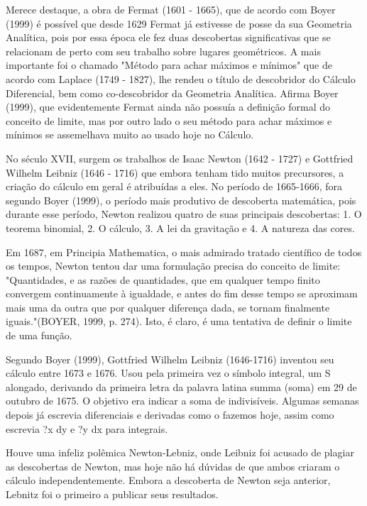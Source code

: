 \documentclass{article}
\begin{document}
\medskip
 Merece destaque, a obra de Fermat (1601 - 1665), que de acordo com
Boyer (1999) é possível que desde 1629 Fermat já estivesse de posse
da sua Geometria Analítica, pois por essa época ele fez duas
descobertas significativas que se relacionam de perto com seu
trabalho sobre lugares geométricos. A mais importante foi o chamado
"Método para achar máximos e mínimos" que de acordo com Laplace
(1749 - 1827), lhe rendeu o título de descobridor do Cálculo
Diferencial, bem como co-descobridor da Geometria Analítica.  Afirma
Boyer (1999), que evidentemente Fermat ainda não possuía a definição
formal do conceito de limite, mas por outro lado o seu método para
achar máximos e mínimos se assemelhava muito ao usado hoje no
Cálculo.

\medskip
 No século XVII, surgem
os trabalhos de Isaac Newton (1642 - 1727) e Gottfried Wilhelm
Leibniz (1646 - 1716) que embora tenham tido muitos precursores, a
criação do cálculo em geral é atribuídas a eles. No período de
1665-1666, fora segundo Boyer (1999), o período mais produtivo de
descoberta matemática, pois durante esse período, Newton realizou
quatro de suas principais descobertas: 1. O teorema binomial, 2. O
cálculo, 3. A lei da gravitação e 4. A natureza das cores.

\medskip
 Em 1687,
em Principia Mathematica, o mais admirado tratado científico de
todos os tempos, Newton tentou dar uma formulação precisa do
conceito de limite: "Quantidades, e as razões de quantidades, que em
qualquer tempo finito convergem continuamente à igualdade, e antes
do fim desse tempo se aproximam mais uma da outra que por qualquer
diferença dada, se tornam finalmente iguais."(BOYER, 1999, p. 274). Isto, é claro, é uma
tentativa de definir o limite de uma função.

\medskip
 Segundo Boyer (1999),
Gottfried Wilhelm Leibniz (1646-1716) inventou seu cálculo entre
1673 e 1676. Usou pela primeira vez o símbolo integral, um S
alongado, derivando da primeira letra da palavra latina summa (soma)
em 29 de outubro de 1675. O objetivo era indicar a soma de
indivisíveis. Algumas semanas depois já escrevia diferenciais e
derivadas como o fazemos hoje, assim como escrevia ?x dy e ?y dx
para integrais.

\medskip
 Houve uma infeliz polêmica Newton-Lebniz, onde
Leibniz foi acusado de plagiar as descobertas de Newton, mas hoje
não há dúvidas de que ambos criaram o cálculo independentemente.
Embora a descoberta de Newton seja anterior, Lebnitz foi o primeiro
a publicar seus resultados.
\end{document}
